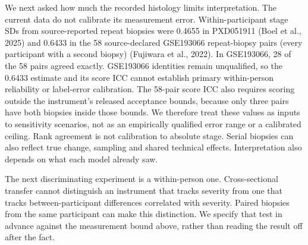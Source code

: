 We next asked how much the recorded histology limits interpretation. The
current data do not calibrate its measurement error. Within-participant stage
SDs from source-reported repeat biopsies were 0.4655 in PXD051911 (Boel et al., 2025) and 0.6433 in the 58 source-declared GSE193066 repeat-biopsy pairs (every participant with a second biopsy) (Fujiwara et al., 2022). In GSE193066, 28 of the 58 pairs agreed exactly.
GSE193066 identities remain unqualified, so the 0.6433 estimate and its score
ICC cannot establish primary within-person reliability or label-error
calibration. The 58-pair score ICC also requires scoring outside the
instrument's released acceptance bounds, because only three pairs have both
biopsies inside those bounds. We therefore treat these values as inputs to
sensitivity scenarios, not as an empirically qualified error range or a
calibrated ceiling. Rank agreement is not calibration to absolute stage. Serial
biopsies can also reflect true change, sampling and shared technical effects.
Interpretation also depends on what each model already saw.

The next discriminating experiment is a within-person one. Cross-sectional
transfer cannot distinguish an instrument that tracks severity from one that
tracks between-participant differences correlated with severity. Paired
biopsies from the same participant can make this distinction. We specify that
test in advance against the measurement bound above, rather than reading the
result off after the fact.
